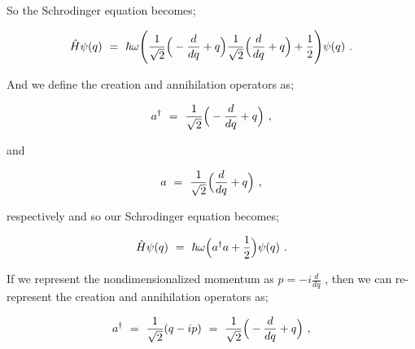 \documentclass{article}
\begin{document}
So the Schrodinger equation becomes;

\begin{equation} \label{eb-eq-256-8}
\hat{H}\psi(q) \hspace{0.125cm} = \hspace{0.125cm} \hbar \omega \Bigg( \frac{1}{\sqrt{2}} \Big( -\frac{d}{dq} + q \Big) \frac{1}{\sqrt{2}} \Big( \frac{d}{dq} + q \Big) + \frac{1}{2} \Bigg) \psi(q) \hspace{0.125cm} .
\end{equation}

And we define the creation and annihilation operators as;

\begin{equation} \label{eb-eq-256-9}
a^{\dagger} \hspace{0.125cm} = \hspace{0.125cm} \frac{1}{\sqrt{2}} \Big( -\frac{d}{dq} + q \Big) \hspace{0.125cm} ,
\end{equation}

and

\begin{equation} \label{eb-eq-256-10}
a \hspace{0.125cm} = \hspace{0.125cm} \frac{1}{\sqrt{2}} \Big( \frac{d}{dq} + q \Big)  \hspace{0.125cm} ,
\end{equation}

 respectively and so our Schrodinger equation becomes;

\begin{equation} \label{eb-eq-256-11}
\hat{H}\psi(q) \hspace{0.125cm} = \hspace{0.125cm} \hbar \omega \Big( a^{\dagger} a + \frac{1}{2} \Big) \psi(q) \hspace{0.125cm} .
\end{equation}

If we represent the nondimensionalized momentum as \begin{math} p = -i\frac{d}{dq} \end{math} , then we can re-represent the creation and annihilation operators as;

\begin{equation} \label{eb-eq-256-12}
a^{\dagger} \hspace{0.125cm} = \hspace{0.125cm}  \frac{1}{\sqrt{2}} ( q - i p) \hspace{0.125cm} = \hspace{0.125cm} \frac{1}{\sqrt{2}} \Big( -\frac{d}{dq} + q \Big) \hspace{0.125cm} ,
\end{equation}
\end{document}
